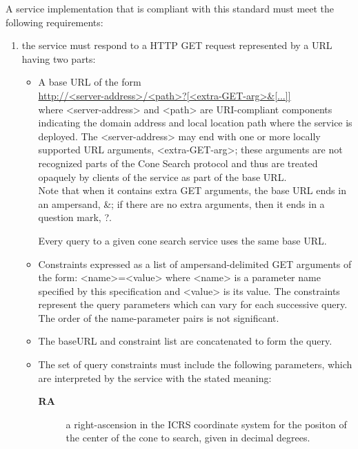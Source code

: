 \documentclass[11pt,a4paper]{ivoa}
\begin{document}
A service implementation that is compliant with this standard must meet the following requirements:

\begin{enumerate}
	\item the service must respond to a HTTP GET request represented by a URL having two parts:\\
	\begin{itemize}
		\item A base URL of the form\\
		
		\url{http://<server-address>/<path>?[<extra-GET-arg>&[...]]}\\
		
		where <server-address> and <path> are URI-compliant components indicating the domain address and local location path where the service is deployed. The <server-address> may end with one or more locally supported URL arguments, <extra-GET-arg>; these arguments are not recognized parts of the Cone Search protocol and thus are treated opaquely by clients of the service as part of the base URL.\\
Note that when it contains extra GET arguments, the base URL ends in an ampersand, \&; if there are no extra arguments, then it ends in a question mark, ?.\\
		Every query to a given cone search service uses the same base URL.
		\item Constraints expressed as a list of ampersand-delimited GET arguments of the form: <name>=<value> where <name> is a parameter name specified by this specification and <value> is its value. The constraints represent the query parameters which can vary for each successive query. The order of the name-parameter pairs is not significant.
		\item The baseURL and constraint list are concatenated to form the query.
		\item The set of query constraints must include the following parameters, which are interpreted by the service with the stated meaning:
		\begin{description}
			\item[\textbf{RA}] a right-ascension in the ICRS coordinate system for the positon of the center of the cone to search, given in decimal degrees.

\end{description}
\end{itemize}
\end{enumerate}
\end{document}
